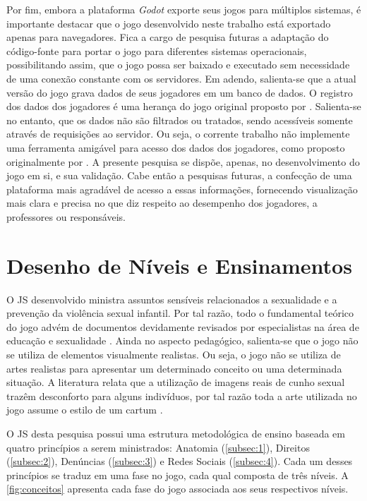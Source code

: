 Por fim, embora a plataforma \textit{Godot} exporte seus jogos para múltiplos sistemas, é importante destacar que o jogo desenvolvido neste trabalho está exportado apenas para navegadores. Fica a cargo de pesquisa futuras a adaptação do código-fonte para portar o jogo para diferentes sistemas operacionais, possibilitando assim, que o jogo possa ser baixado e executado sem necessidade de uma conexão constante com os servidores. Em adendo, salienta-se que a atual versão do jogo grava dados de seus jogadores em um banco de dados. O registro dos dados dos jogadores é uma herança do jogo original proposto por . Salienta-se no entanto, que os dados não são filtrados ou tratados, sendo acessíveis somente através de requisições ao servidor. Ou seja, o corrente trabalho não implemente uma ferramenta amigável para acesso dos dados dos jogadores, como proposto originalmente por . A presente pesquisa se dispõe, apenas, no desenvolvimento do jogo em si, e sua validação. Cabe então a pesquisas futuras, a confecção de uma plataforma mais agradável de acesso a essas informações, fornecendo visualização mais clara e precisa no que diz respeito ao desempenho dos jogadores, a professores ou responsáveis.  



\section{Desenho de Níveis e Ensinamentos}\label{sec:DN}

O \acf{JS} desenvolvido ministra assuntos sensíveis relacionados a sexualidade e a prevenção da violência sexual infantil. Por tal razão, todo o fundamental teórico do jogo advém de documentos devidamente revisados por especialistas na área de educação e sexualidade \cite{unesco2018international}. Ainda no aspecto pedagógico, salienta-se que o jogo não se utiliza de elementos visualmente realistas. Ou seja, o jogo não se utiliza de artes realistas para apresentar um determinado conceito ou uma determinada situação. A literatura relata que a utilização de imagens reais de cunho sexual trazêm desconforto para alguns indivíduos, por tal razão toda a arte utilizada no jogo assume o estilo de um cartum \cite{albert2020desenvolvimento}.

O \ac{JS} desta pesquisa possui uma estrutura metodológica de ensino baseada em quatro princípios a serem ministrados: Anatomia (\autoref{subsec:1}), Direitos (\autoref{subsec:2}), Denúncias (\autoref{subsec:3}) e Redes Sociais (\autoref{subsec:4}). Cada um desses princípios se traduz em uma fase no jogo, cada qual composta de três níveis. A \autoref{fig:conceitos} apresenta cada fase do jogo associada aos seus respectivos níveis.

